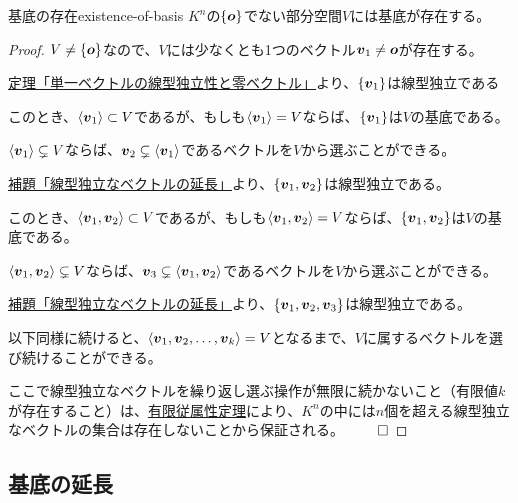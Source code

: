 \documentclass[../../../topic_linear-algebra]{subfiles}
\begin{document}
\begin{theorem}{基底の存在}{existence-of-basis}
  $K^n$の$\{\vb*{o} \}$でない部分空間$V$には基底が存在する。
\end{theorem}

\begin{proof}
  $V \neq  \{\vb*{o} \}$なので、$V$には少なくとも1つのベクトル$\vb*{v}_1 \neq \vb*{o}$が存在する。

  \hyperref[thm:single-vec-indep-iff-nonzero]{定理「単一ベクトルの線型独立性と零ベクトル」}より、$\{\vb*{v}_1 \}$は線型独立である

  \br

  このとき、$\langle \vb*{v}_1 \rangle \subset V$であるが、もしも$\langle \vb*{v}_1 \rangle = V$ならば、$\{\vb*{v}_1 \}$は$V$の基底である。

  \br

  $\langle \vb*{v}_1 \rangle \subsetneq V$ならば、$\vb*{v}_2 \subsetneq \langle \vb*{v}_1 \rangle$であるベクトルを$V$から選ぶことができる。

  \hyperref[thm:extend-indep-outside-subspace]{補題「線型独立なベクトルの延長」}より、$\{\vb*{v}_1, \vb*{v}_2 \}$は線型独立である。

  \br

  このとき、$\langle \vb*{v}_1, \vb*{v}_2 \rangle \subset V$であるが、もしも$\langle \vb*{v}_1, \vb*{v}_2 \rangle = V$ならば、$\{\vb*{v}_1, \vb*{v}_2 \}$は$V$の基底である。

  \br

  $\langle \vb*{v}_1, \vb*{v}_2 \rangle \subsetneq V$ならば、$\vb*{v}_3 \subsetneq \langle \vb*{v}_1, \vb*{v}_2 \rangle$であるベクトルを$V$から選ぶことができる。

  \hyperref[thm:extend-indep-outside-subspace]{補題「線型独立なベクトルの延長」}より、$\{\vb*{v}_1, \vb*{v}_2, \vb*{v}_3 \}$は線型独立である。

  \br

  以下同様に続けると、$\langle \vb*{v}_1, \vb*{v}_2, \dots, \vb*{v}_k \rangle = V$となるまで、$V$に属するベクトルを選び続けることができる。

  \br

  ここで線型独立なベクトルを繰り返し選ぶ操作が無限に続かないこと（有限値$k$が存在すること）は、\hyperref[thm:finite-dependency]{有限従属性定理}により、$K^n$の中には$n$個を超える線型独立なベクトルの集合は存在しないことから保証される。 $\qed$
\end{proof}

\subsection{基底の延長}
\end{document}
